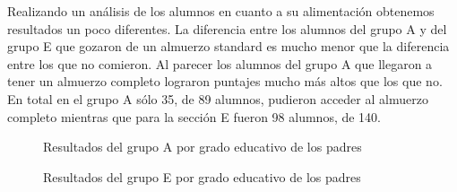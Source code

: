 \documentclass{article}
\begin{document}
    Realizando un an\'alisis de los alumnos en cuanto a su alimentaci\'on obtenemos resultados un poco diferentes.
    La diferencia entre los alumnos del grupo A y del grupo E que gozaron de un almuerzo standard es mucho menor
    que la diferencia entre los que no comieron. Al parecer los alumnos del grupo A que llegaron a tener un almuerzo
    completo lograron puntajes mucho m\'as altos que los que no. 
    En total en el grupo A s\'olo 35, de 89 alumnos, pudieron acceder al almuerzo completo
    mientras que para la secci\'on E fueron 98 alumnos, de 140. 
    

    \begin{figure}[H]
        \noindent{}
        \caption{Resultados del grupo A por grado educativo de los padres}
        \label{fig:minipage1}
    \end{figure}

    \begin{figure}[H]
        \noindent{}
        \caption{Resultados del grupo E por grado educativo de los padres}
        \label{fig:minipage1}
    \end{figure}
\end{document}
